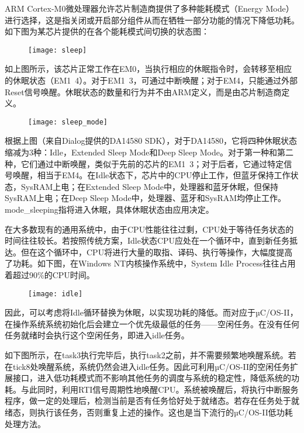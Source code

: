 \documentclass{ctexart}
\begin{document}
ARM Cortex-M0微处理器允许芯片制造商提供了多种能耗模式（Energy Mode）进行选择，这是指关闭或开启部分组件从而在牺牲一部分功能的情况下降低功耗。如下图为某芯片提供的在各个能耗模式间切换的状态图：\par
\begin{figure}[h]
\centering
\texttt{[image: sleep]}\par
\end{figure}
如上图所示，该芯片正常工作在EM0，当执行相应的休眠指令时，会转移至相应的休眠状态（EM1~4）。对于EM1~3，可通过中断唤醒；对于EM4，只能通过外部Reset信号唤醒。休眠状态的数量和行为并不由ARM定义，而是由芯片制造商定义。\par
\begin{figure}[h]
\centering
\texttt{[image: sleep\_mode]}\par
\end{figure}
根据上图（来自Dialog提供的DA14580 SDK），对于DA14580，它将四种休眠状态缩减为3种：Idle，Extended Sleep Mode和Deep Sleep Mode。对于第一种和第二种，它们通过中断唤醒，类似于先前的芯片的EM1~3；对于后者，它通过特定信号唤醒，相当于EM4。在Idle状态下，芯片中的CPU停止工作，但蓝牙保持工作状态，SysRAM上电；在Extended Sleep Mode中，处理器和蓝牙休眠，但保持SysRAM上电；在Deep Sleep Mode中，处理器、蓝牙和SysRAM均停止工作。mode\_sleeping指将进入休眠，具体休眠状态由应用决定。\par
在大多数现有的通用系统中，由于CPU性能往往过剩，CPU处于等待任务状态的时间往往较长。若按照传统方案，Idle状态CPU应处在一个循环中，直到新任务抵达。但在这个循环中，CPU将进行大量的取指、译码、执行等操作，大幅度提高了功耗。如下图，在Windows NT内核操作系统中，System Idle Process往往占用着超过90\%的CPU时间\cite{wiki06}。\par
\begin{figure}[h]
\centering
\texttt{[image: idle]}\par
\end{figure}
因此，可以考虑将Idle循环替换为休眠，以实现功耗的降低。而对应于µC/OS-II，在操作系统系统初始化后会建立一个优先级最低的任务——空闲任务。在没有任何任务就绪时会执行这个空闲任务，即进入idle任务。\par
如下图所示，在task3执行完毕后，执行task2之前，并不需要频繁地唤醒系统。若在tick8处唤醒系统，系统仍然会进入idle任务。因此可利用µC/OS-II的空闲任务扩展接口，进入低功耗模式而不影响其他任务的调度与系统的稳定性，降低系统的功耗。与此同时，利用RTI信号周期性地唤醒CPU。系统被唤醒后，将执行中断服务程序，做一定的处理后，检测当前是否有任务恰好处于就绪态。若存在任务处于就绪态，则执行该任务，否则重复上述的操作。这也是当下流行的µC/OS-II低功耗处理方法。\par
\end{document}
